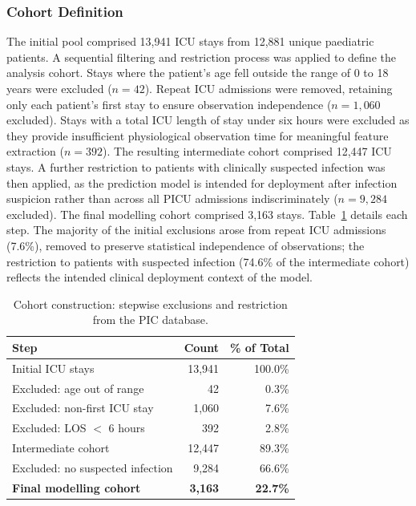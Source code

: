 \documentclass[final,3p,times]{elsarticle}
\begin{document}
\subsubsection{Cohort Definition}
\label{subsec:cohort}

The initial pool comprised 13,941 ICU stays from 12,881 unique
paediatric patients. A sequential filtering and restriction
process was applied to define the analysis cohort. Stays where
the patient's age fell outside the range of 0 to 18 years were
excluded ($n = 42$). Repeat ICU admissions were removed, retaining
only each patient's first stay to ensure observation independence
($n = 1{,}060$ excluded). Stays with a total ICU length of stay
under six hours were excluded as they provide insufficient
physiological observation time for meaningful feature extraction
($n = 392$). The resulting intermediate cohort comprised 12,447
ICU stays. A further restriction to patients with clinically
suspected infection was then applied, as the prediction model is
intended for deployment after infection suspicion rather than
across all PICU admissions indiscriminately ($n = 9{,}284$
excluded). The final modelling cohort comprised 3,163 stays.
Table~\ref{tab:cohort_flow} details each step. The majority of the
initial exclusions arose from repeat ICU admissions (7.6\%),
removed to preserve statistical independence of observations; the
restriction to patients with suspected infection (74.6\% of the
intermediate cohort) reflects the intended clinical deployment
context of the model.

\begin{table}[htbp]
\centering
\caption{Cohort construction: stepwise exclusions and restriction
from the PIC database.}
\label{tab:cohort_flow}
\small
\begin{tabular}{lrr}
\toprule
\textbf{Step} & \textbf{Count} & \textbf{\% of Total} \\
\midrule
Initial ICU stays                   & 13,941 & 100.0\% \\
Excluded: age out of range          &     42 &   0.3\% \\
Excluded: non-first ICU stay        &  1,060 &   7.6\% \\
Excluded: LOS $<$ 6 hours           &    392 &   2.8\% \\
\midrule
Intermediate cohort                 & 12,447 &  89.3\% \\
Excluded: no suspected infection    &  9,284 &  66.6\% \\
\midrule
\textbf{Final modelling cohort}     & \textbf{3,163} & \textbf{22.7\%} \\
\bottomrule
\end{tabular}
\end{table}
\end{document}
